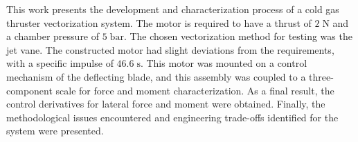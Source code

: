 This work presents the development and characterization process of a cold gas thruster vectorization system. The motor is required to have a thrust of \(2\; \mathrm{N}\) and a chamber pressure of \(5\; \mathrm{bar}\). The chosen vectorization method for testing was the jet vane. The constructed motor had slight deviations from the requirements, with a specific impulse of \(46.6\; \mathrm{s}\). This motor was mounted on a control mechanism of the deflecting blade, and this assembly was coupled to a three-component scale for force and moment characterization. As a final result, the control derivatives for lateral force and moment were obtained. Finally, the methodological issues encountered and engineering trade-offs identified for the system were presented.